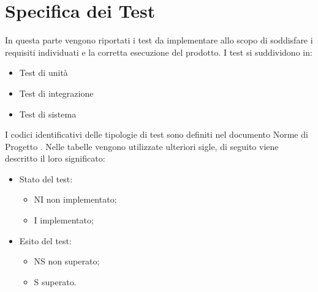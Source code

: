 \section{Specifica dei Test}
In questa parte vengono riportati i test da implementare allo scopo
di soddisfare i requisiti individuati e la corretta esecuzione del prodotto.
I test si suddividono in:
\begin{itemize}
    \item Test di unità
    \item Test di integrazione
    \item Test di sistema
\end{itemize}
I codici identificativi delle tipologie di test sono definiti nel documento Norme di Progetto {\docVersionNdP}.
Nelle tabelle vengono utilizzate ulteriori sigle, di seguito viene descritto il loro significato:
\begin{itemize}
    \item Stato del test:
    \begin{itemize}
        \item NI non implementato;
        \item I implementato;
    \end{itemize}
    \item Esito del test:
    \begin{itemize}
        \item NS non superato;
        \item S superato.
    \end{itemize}
\end{itemize}

